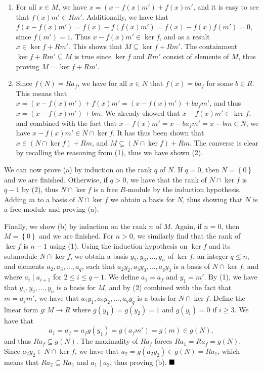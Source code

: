 \documentclass[12pt]{article}
\newcommand{\braceb}[1]{\left\{#1\right\}}
\newcommand{\done}{\ensuremath{\strut\hfill\blacksquare}}
\begin{document}
\begin{enumerate}[(1):]
	\item For all \( x \in M \), we have \( x = (x - f(x)m') + f(x)m' \),
	      and it is easy to see that \( f(x)m' \in Rm' \).
	      Additionally, we have that
	      \( f(x - f(x)m') = f(x) - f(f(x)m') = f(x) - f(x)f(m') = 0 \),
	      since \( f(m') = 1 \).
	      Thus \( x - f(x)m' \in \ker f \), and as a result
	      \( x \in \ker f + Rm' \).
	      This shows that \( M \subseteq \ker f + Rm' \).
	      The containment \( \ker f + Rm' \subseteq M \) is true since
	      \( \ker f \) and \( Rm' \) consist of elements of \( M \), thus
	      proving \( M = \ker f + Rm' \).

	\item Since \( f(N) = Ra_f \), we have for all \( x \in N \) that
	      \( f(x) = ba_f \) for some \( b \in R \).
	      This means that
	      \( x = (x - f(x)m') + f(x)m' = (x - f(x)m') + ba_fm' \), and thus
	      \( x = (x - f(x)m') + bm \).
	      We already showed that \( x - f(x)m' \in \ker f \), and combined with
	      the fact that \( x - f(x)m' = x - ba_fm' = x - bm \in N \), we have
	      \( x - f(x)m' \in N \cap \ker f \).
	      It has thus been shown that \( x \in (N \cap \ker f) + Rm \), and
	      \( M \subseteq (N \cap \ker f) + Rm \).
	      The converse is clear by recalling the reasoning from (1), thus
	      we have shown (2).
\end{enumerate}

We can now prove (a) by induction on the rank \( q \) of \( N \).
If \( q = 0 \), then \( N = \braceb{0} \) and we are finished.
Otherwise, if \( q > 0 \), we have that the rank of \( N \cap \ker f \)
is \( q - 1 \) by (2), thus \( N \cap \ker f \) is a free \( R \)-module by
the induction hypothesis.
Adding \( m \) to a basis of \( N \cap \ker f \) we obtain a basis for
\( N \), thus showing that \( N \) is a free module and proving (a).

Finally, we show (b) by induction on the rank \( n \) of \( M \).
Again, if \( n = 0 \), then \( M = \braceb{0} \) and we are finished.
For \( n > 0 \), we similarly find that the rank of \( \ker f \) is
\( n - 1 \) using (1).
Using the induction hypothesis on \( \ker f \) and its submodule
\( N \cap \ker f \), we obtain a basis \( y_2, y_3, \dots, y_n \) of
\( \ker f \), an integer \( q \leq n \), and elements
\( a_2, a_3, \dots, a_q \), such that \( a_2y_2, a_3y_3, \dots, a_qy_3 \) is
a basis of \( N \cap \ker f \), and where \( a_i \mid a_{i + 1} \) for
\( 2 \leq i \leq q - 1 \).
We define \( a_1 = a_f \) and \( y_1 = m' \).
By (1), we have that \( y_1, y_2, \dots, y_n \) is a basis for \( M \), and by
(2) combined with the fact that \( m = a_fm' \), we have that
\( a_1y_1, a_2y_2, \dots, a_qy_q \) is a basis for \( N \cap \ker f \).
Define the linear form \( g : M \to R \) where \( g(y_1) = g(y_2) = 1 \)
and \( g(y_i) = 0 \) if \( i \geq 3 \).
We have that
\[
	a_1 = a_f = a_fg(y_1) = g(a_fm') = g(m) \in g(N),
\]
and thus \( Ra_f \subseteq g(N) \).
The maximality of \( Ra_f \) forces \( Ra_1 = Ra_f = g(N) \).
Since \( a_2y_2 \in N \cap \ker f \), we have that
\( a_2 = g(a_2y_2) \in g(N) = Ra_1 \),
which means that \( Ra_2 \subseteq Ra_1 \) and \( a_1 \mid a_2 \), thus
proving (b).
\done
\end{document}
